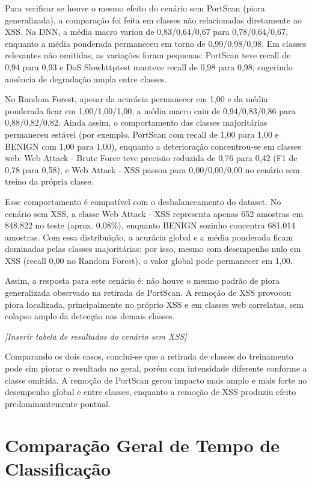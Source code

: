 \documentclass[12pt,oneside]{abntex2}
\begin{document}
Para verificar se houve o mesmo efeito do cenário sem PortScan (piora generalizada), a comparação foi feita em classes não relacionadas diretamente ao XSS. Na DNN, a média macro variou de 0,83/0,64/0,67 para 0,78/0,64/0,67, enquanto a média ponderada permaneceu em torno de 0,99/0,98/0,98. Em classes relevantes não omitidas, as variações foram pequenas: PortScan teve recall de 0,94 para 0,93 e DoS Slowhttptest manteve recall de 0,98 para 0,98, sugerindo ausência de degradação ampla entre classes.

No Random Forest, apesar da acurácia permanecer em 1,00 e da média ponderada ficar em 1,00/1,00/1,00, a média macro caiu de 0,94/0,83/0,86 para 0,88/0,82/0,82. Ainda assim, o comportamento das classes majoritárias permaneceu estável (por exemplo, PortScan com recall de 1,00 para 1,00 e BENIGN com 1,00 para 1,00), enquanto a deterioração concentrou-se em classes web: Web Attack - Brute Force teve precisão reduzida de 0,76 para 0,42 (F1 de 0,78 para 0,58), e Web Attack - XSS passou para 0,00/0,00/0,00 no cenário sem treino da própria classe.

Esse comportamento é compatível com o desbalanceamento do dataset. No cenário sem XSS, a classe Web Attack - XSS representa apenas 652 amostras em 848.822 no teste (aprox. 0,08\%), enquanto BENIGN sozinho concentra 681.014 amostras. Com essa distribuição, a acurácia global e a média ponderada ficam dominadas pelas classes majoritárias; por isso, mesmo com desempenho nulo em XSS (recall 0,00 no Random Forest), o valor global pode permanecer em 1,00.

Assim, a resposta para este cenário é: não houve o mesmo padrão de piora generalizada observado na retirada de PortScan. A remoção de XSS provocou piora localizada, principalmente no próprio XSS e em classes web correlatas, sem colapso amplo da detecção nas demais classes.

\begin{center}
\textit{[Inserir tabela de resultados do cenário sem XSS]}
\end{center}

Comparando os dois casos, conclui-se que a retirada de classes do treinamento pode sim piorar o resultado no geral, porém com intensidade diferente conforme a classe omitida. A remoção de PortScan gerou impacto mais amplo e mais forte no desempenho global e entre classes, enquanto a remoção de XSS produziu efeito predominantemente pontual.

\section{Comparação Geral de Tempo de Classificação}
\end{document}
